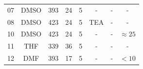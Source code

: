 \documentclass[../Master.tex]{subfiles}
\begin{document}
\begin{landscape}
\begin{table}[h]
\begin{tabular}{cccccccc}
			07     & DMSO        & 393                 & 24                    & 5                        & -               & -         & -              \\
			08     & DMSO        & 423                 & 24                    & 5                        & TEA             & -         & -              \\
			10     & DMSO        & 423                 & 24                    & 5                        & -               & -         & \(\approx 25\) \\
			11     & THF         & 339                 & 36                    & 5                        & -               & -         & -              \\
			12     & DMF         & 393                 & 17                    & 5                        & -               & -         & \(< 10\)       \\
			\bottomrule
		\end{tabular}
	\end{table}
	\vspace*{\fill}
	\newpage
	\thispagestyle{empty}
	\vspace*{\fill}

\end{landscape}
\end{document}
